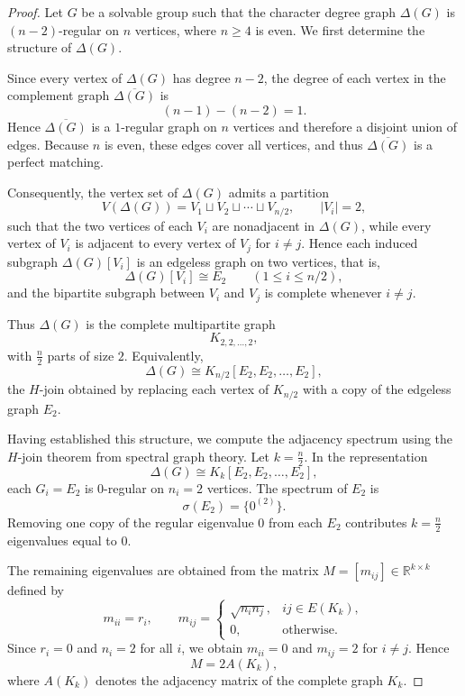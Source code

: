 \documentclass[11pt]{amsart}
\begin{document}
\begin{proof}
Let \(G\) be a solvable group such that the character degree graph \(\Delta(G)\) is \((n-2)\)-regular on \(n\) vertices, where \(n\ge4\) is even. We first determine the structure of \(\Delta(G)\).

Since every vertex of \(\Delta(G)\) has degree \(n-2\), the degree of each vertex in the complement graph \(\overline{\Delta(G)}\) is
\[
(n-1)-(n-2)=1.
\]
Hence \(\overline{\Delta(G)}\) is a \(1\)-regular graph on \(n\) vertices and therefore a disjoint union of edges. Because \(n\) is even, these edges cover all vertices, and thus \(\overline{\Delta(G)}\) is a perfect matching.

Consequently, the vertex set of \(\Delta(G)\) admits a partition
\[
V(\Delta(G))=V_1\sqcup V_2\sqcup\cdots\sqcup V_{n/2},
\qquad |V_i|=2,
\]
such that the two vertices of each \(V_i\) are nonadjacent in \(\Delta(G)\), while every vertex of \(V_i\) is adjacent to every vertex of \(V_j\) for \(i\neq j\). Hence each induced subgraph \(\Delta(G)[V_i]\) is an edgeless graph on two vertices, that is,
\[
\Delta(G)[V_i]\cong E_2 \qquad (1\le i\le n/2),
\]
and the bipartite subgraph between \(V_i\) and \(V_j\) is complete whenever \(i\neq j\).

Thus \(\Delta(G)\) is the complete multipartite graph
\[
K_{2,2,\dots,2},
\]
with \(\frac{n}{2}\) parts of size \(2\). Equivalently,
\[
\Delta(G)\cong K_{n/2}[E_2,E_2,\dots,E_2],
\]
the \(H\)-join obtained by replacing each vertex of \(K_{n/2}\) with a copy of the edgeless graph \(E_2\).

Having established this structure, we compute the adjacency spectrum using the \(H\)-join theorem from spectral graph theory. Let \(k=\frac{n}{2}\). In the representation
\[
\Delta(G)\cong K_k[E_2,E_2,\dots,E_2],
\]
each \(G_i=E_2\) is \(0\)-regular on \(n_i=2\) vertices. The spectrum of \(E_2\) is
\[
\sigma(E_2)=\{0^{(2)}\}.
\]
Removing one copy of the regular eigenvalue \(0\) from each \(E_2\) contributes \(k=\frac{n}{2}\) eigenvalues equal to \(0\).

The remaining eigenvalues are obtained from the matrix \(M=[m_{ij}]\in\mathbb{R}^{k\times k}\) defined by
\[
m_{ii}=r_i,\qquad 
m_{ij}=
\begin{cases}
\sqrt{n_in_j}, & ij\in E(K_k),\\
0, & \text{otherwise}.
\end{cases}
\]
Since \(r_i=0\) and \(n_i=2\) for all \(i\), we obtain \(m_{ii}=0\) and \(m_{ij}=2\) for \(i\neq j\). Hence
\[
M=2A(K_k),
\]
where \(A(K_k)\) denotes the adjacency matrix of the complete graph \(K_k\).


\end{proof}
\end{document}
